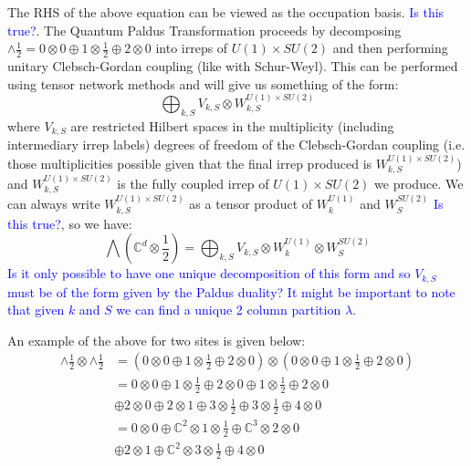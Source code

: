 \documentclass[aps,prx,twocolumn,floatfix,10pt,amssymb,amsfont,amsmath,superscriptaddress,float,nofootinbib,longbibliography,nobalancelastpage]{revtex4-2}
\begin{document}
The RHS of the above equation can be viewed as the occupation basis. \textcolor{blue}{Is this true?}. The Quantum Paldus Transformation proceeds by decomposing $\wedge \frac{1}{2} = 0\otimes 0\oplus 1\otimes \frac{1}{2} \oplus 2 \otimes 0$ into irreps of $U(1)\times SU(2)$ and then performing unitary Clebsch-Gordan coupling (like with Schur-Weyl). This can be performed using tensor network methods and will give us something of the form:
\begin{equation}
    \bigoplus_{k,S} V_{k,S} \otimes W^{U(1)\times SU(2)}_{k,S}
\end{equation}
where $V_{k,S}$ are restricted Hilbert spaces in the multiplicity (including intermediary irrep labels) degrees of freedom of the Clebsch-Gordan coupling (i.e. those multiplicities possible given that the final irrep produced is $W^{U(1)\times SU(2)}_{k,S}$) and $W^{U(1)\times SU(2)}_{k,S}$ is the fully coupled irrep of $U(1)\times SU(2)$ we produce. We can always write $W^{U(1)\times SU(2)}_{k,S}$ as a tensor product of $W^{U(1)}_k$ and $W^{SU(2)}_S$ \textcolor{blue}{Is this true?}, so we have:
\begin{equation}
     \bigwedge(\mathbb{C}^d\otimes \frac{1}{2}) = \bigoplus_{k,S}V_{k,S} \otimes W^{U(1)}_k \otimes W_S^{SU(2)}
\end{equation}\textcolor{blue}{Is it only possible to have one unique decomposition of this form and so $V_{k,S}$ must be of the form given by the Paldus duality? It might be important to note that given $k$ and $S$ we can find a unique 2 column partition $\lambda$.}

An example of the above for two sites is given below:
\begin{align*}
    \wedge \frac{1}{2} \otimes \wedge \frac{1}{2} &= (0\otimes 0\oplus 1\otimes \frac{1}{2} \oplus 2 \otimes 0) \otimes (0\otimes 0\oplus 1\otimes \frac{1}{2} \oplus 2 \otimes 0)\\
    &= 0\otimes 0\oplus 1\otimes \frac{1}{2} \oplus 2 \otimes 0 \oplus 1 \otimes \frac{1}{2}\oplus 2 \otimes 0\\
    & \oplus 2\otimes 0 \oplus 2 \otimes 1 \oplus 3 \otimes \frac{1}{2}\oplus 3 \otimes \frac{1}{2} \oplus 4 \otimes 0\\
    &= 0\otimes 0\oplus \mathbb{C}^2 \otimes 1\otimes \frac{1}{2} \oplus \mathbb{C}^3 \otimes 2 \otimes 0 \\
    & \oplus 2 \otimes 1 \oplus \mathbb{C}^2 \otimes3 \otimes \frac{1}{2} \oplus 4 \otimes 0\\
\end{align*}
\end{document}
